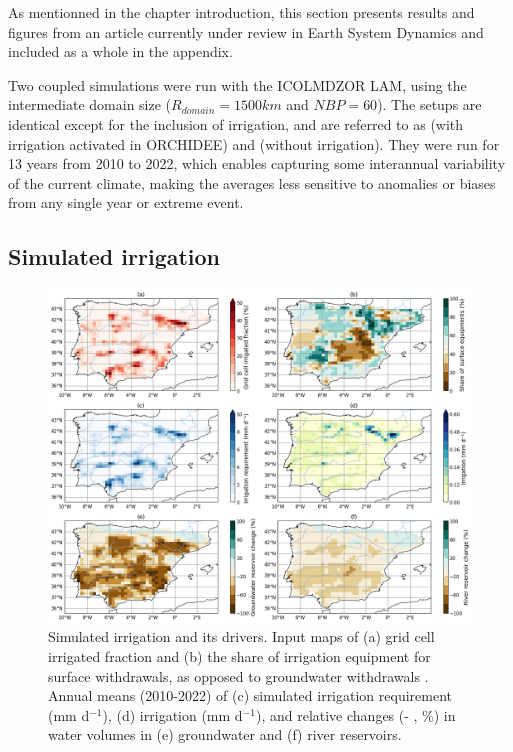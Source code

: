 As mentionned in the chapter introduction, this section presents results and figures from an article currently under review in Earth System Dynamics and included as a whole in the appendix. %

Two coupled simulations were run with the ICOLMDZOR LAM, using the intermediate domain size ($R_{domain}=1500km$ and $NBP=60$). The setups are identical except for the inclusion of irrigation, and are referred to as \irr (with irrigation activated in ORCHIDEE) and \noirr (without irrigation). 
They were run for 13 years from 2010 to 2022, which enables capturing some interannual variability of the current climate, making the averages less sensitive to anomalies or biases from any single year or extreme event.

\subsection{Simulated irrigation}
\label{sec:irrig_eval}

\begin{figure}[htbp]
    \centering
    \includegraphics[width=\textwidth]{images/chap4/article/f03.png}
    \caption{Simulated irrigation and its drivers. Input maps of (a) grid cell irrigated fraction \citep[\% , derived from][]{hurtt_harmonization_2020} and (b) the share of irrigation equipment for surface withdrawals, as opposed to groundwater withdrawals \citep[\%, derived from ][]{siebert_groundwater_2010}. Annual means (2010-2022) of (c) simulated irrigation requirement (mm d$^{-1}$), (d) irrigation (mm d$^{-1}$), and relative changes (\irr - \noirr, \%) in water volumes in (e) groundwater and (f) river reservoirs.}
    \label{fig:irrig_maps}
\end{figure}

